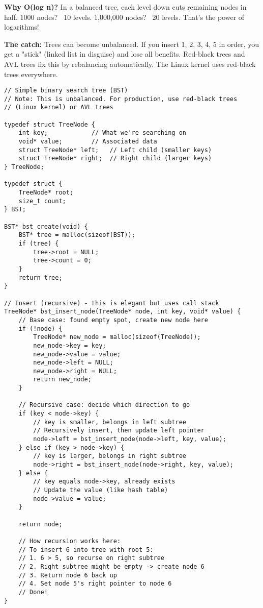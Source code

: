 \textbf{Why O(log n)?} In a balanced tree, each level down cuts remaining nodes in half. 1000 nodes? ~10 levels. 1,000,000 nodes? ~20 levels. That's the power of logarithms!

\textbf{The catch:} Trees can become unbalanced. If you insert 1, 2, 3, 4, 5 in order, you get a "stick" (linked list in disguise) and lose all benefits. Red-black trees and AVL trees fix this by rebalancing automatically. The Linux kernel uses red-black trees everywhere.

\begin{lstlisting}
// Simple binary search tree (BST)
// Note: This is unbalanced. For production, use red-black trees
// (Linux kernel) or AVL trees

typedef struct TreeNode {
    int key;            // What we're searching on
    void* value;        // Associated data
    struct TreeNode* left;   // Left child (smaller keys)
    struct TreeNode* right;  // Right child (larger keys)
} TreeNode;

typedef struct {
    TreeNode* root;
    size_t count;
} BST;

BST* bst_create(void) {
    BST* tree = malloc(sizeof(BST));
    if (tree) {
        tree->root = NULL;
        tree->count = 0;
    }
    return tree;
}

// Insert (recursive) - this is elegant but uses call stack
TreeNode* bst_insert_node(TreeNode* node, int key, void* value) {
    // Base case: found empty spot, create new node here
    if (!node) {
        TreeNode* new_node = malloc(sizeof(TreeNode));
        new_node->key = key;
        new_node->value = value;
        new_node->left = NULL;
        new_node->right = NULL;
        return new_node;
    }

    // Recursive case: decide which direction to go
    if (key < node->key) {
        // key is smaller, belongs in left subtree
        // Recursively insert, then update left pointer
        node->left = bst_insert_node(node->left, key, value);
    } else if (key > node->key) {
        // key is larger, belongs in right subtree
        node->right = bst_insert_node(node->right, key, value);
    } else {
        // key equals node->key, already exists
        // Update the value (like hash table)
        node->value = value;
    }

    return node;

    // How recursion works here:
    // To insert 6 into tree with root 5:
    // 1. 6 > 5, so recurse on right subtree
    // 2. Right subtree might be empty -> create node 6
    // 3. Return node 6 back up
    // 4. Set node 5's right pointer to node 6
    // Done!
}


\end{lstlisting}
